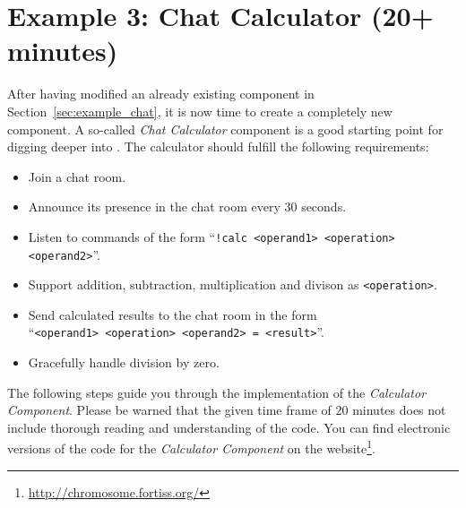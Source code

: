 %
% 
%
%
%
%

\section{Example 3: Chat Calculator (20+ minutes)}
\label{sec:example_chatcalculator}

After having modified an already existing component in Section~\ref{sec:example_chat},
it is now time to create a completely new component.
%
A so-called \emph{Chat Calculator} component is a good starting point for digging deeper into \xme.
%
The calculator should fulfill the following requirements:
\begin{itemize}
	\item Join a chat room.
	\item Announce its presence in the chat room every 30 seconds.
	\item Listen to commands of the form ``\verb|!calc <operand1> <operation> <operand2>|''.
	\item Support addition, subtraction, multiplication and divison as \verb|<operation>|.
	\item Send calculated results to the chat room in the form\\
		``\verb|<operand1> <operation> <operand2> = <result>|''.
	\item Gracefully handle division by zero.
\end{itemize}

The following steps guide you through the implementation of the \emph{Calculator Component}.
Please be warned that the given time frame of 20 minutes does not include thorough reading and understanding of the code.
You can find electronic versions of the code for the \emph{Calculator Component} on the \xme website\footnote{%
\url{http://chromosome.fortiss.org/}}.


